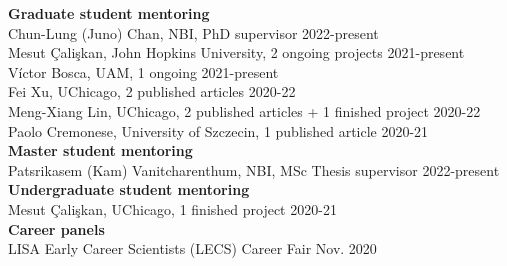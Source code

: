 \documentclass[11pt,a4paper]{article}
\newcommand{\contsizelong}{0.95\linewidth}
\begin{document}
\begin{minipage}[t]{\contsizelong}
\begin{flushleft}
\textbf{Graduate student mentoring} \\
Chun-Lung (Juno) Chan, NBI, PhD supervisor \hfill  2022-present \\
Mesut Çalişkan, John Hopkins University, 2 ongoing projects \hfill  2021-present\\%
Víctor Bosca, UAM, 1 ongoing \hfill  2021-present \\
Fei Xu, UChicago, 2 published articles  \hfill  2020-22 \\
Meng-Xiang Lin, UChicago, 2 published articles + 1 finished project \hfill  2020-22 \\
Paolo Cremonese, University of Szczecin, 1 published article \hfill  2020-21\\
\vspace{5pt}
\textbf{Master student mentoring} \\
Patsrikasem (Kam) Vanitcharenthum, NBI, MSc Thesis supervisor \hfill  2022-present \\
\vspace{5pt}
\textbf{Undergraduate student mentoring} \\
Mesut Çalişkan, UChicago, 1 finished project \hfill  2020-21\\%

\vspace{5pt}
\textbf{Career panels} \\
LISA Early Career Scientists (LECS) Career Fair \hfill  Nov. 2020\\%
\end{flushleft}
\end{minipage}
\end{document}

